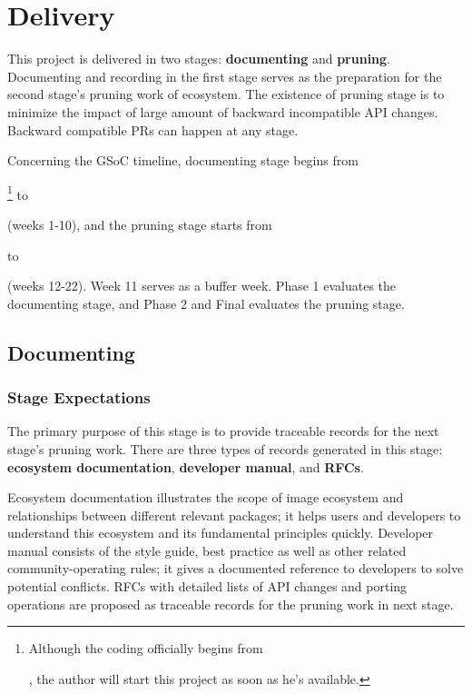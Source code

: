 
\section{Delivery}\label{sec:delivery}

This project is delivered in two stages: \textbf{documenting} and \textbf{pruning}. Documenting and recording in the first stage serves as the preparation for the second stage's pruning work of \images{} ecosystem. The existence of pruning stage is to minimize the impact of large amount of backward incompatible API changes. Backward compatible PRs can happen at any stage. \par

Concerning the GSoC timeline, documenting stage begins from \date{April 22}\footnote{Although the coding officially begins from \date{May 27}, the author will start this project as soon as he's available.} to \date{June 24} (weeks 1-10), and the pruning stage starts from \date{July 1} to \date{August 26} (weeks 12-22). Week 11 serves as a buffer week. \textsf{Phase 1} evaluates the documenting stage, and \textsf{Phase 2} and \textsf{Final} evaluates the pruning stage.

\subsection{Documenting}\label{subsec:documentation}

\subsubsection*{Stage Expectations}

The primary purpose of this stage is to provide traceable records for the next stage's pruning work. There are three types of records generated in this stage: \textbf{ecosystem documentation}, \textbf{developer manual}, and \textbf{RFCs}. \par

Ecosystem documentation illustrates the scope of image ecosystem and relationships between different relevant packages; it helps users and developers to understand this ecosystem and its fundamental principles quickly. Developer manual consists of the style guide, best practice as well as other related community-operating rules; it gives a documented reference to developers to solve potential conflicts. RFCs with detailed lists of API changes and porting operations are proposed as traceable records for the pruning work in next stage. \par


